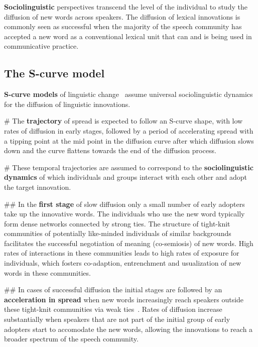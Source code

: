 \documentclass[a4paper, abstract=on]{scrartcl}
\renewcommand{\hw}[1]{\textbf{#1}}
\begin{document}
    \hw{Sociolinguistic} perspectives transcend the level of the individual to study the diffusion of new words across speakers. The diffusion of lexical innovations is commonly seen as successful when the majority of the speech community has accepted a new word as a conventional lexical unit that can and is being used in communicative practice.

  \subsection{The S-curve model}

    \hw{S-curve models} of linguistic change~\parencite{Labov2007,Milroy1992,Nevalainen2015} assume universal sociolinguistic dynamics for the diffusion of linguistic innovations.

    \begin{easylist}[itemize]

      # The \hw{trajectory} of spread is expected to follow an S-curve shape, with low rates of diffusion in early stages, followed by a period of accelerating spread with a tipping point at the mid point in the diffusion curve after which diffusion slows down and the curve flattens towards the end of the diffusion process.

      # These temporal trajectories are assumed to correspond to the \hw{sociolinguistic dynamics} of which individuals and groups interact with each other and adopt the target innovation.

        ## In the \hw{first stage} of slow diffusion only a small number of early adopters take up the innovative words. The individuals who use the new word typically form dense networks connected by strong ties. The structure of tight-knit communities of potentially like-minded individuals of similar backgrounds facilitates the successful negotiation of meaning (co-semiosis) of new words. High rates of interactions in these communities leads to high rates of exposure for individuals, which fosters co-adaption, entrenchment and usualization of new words in these communities.

        ## In cases of successful diffusion the initial stages are followed by an \hw{acceleration in spread} when new words increasingly reach speakers outside these tight-knit communities via weak ties~\parencite{Granovetter1977}. Rates of diffusion increase substantially when speakers that are not part of the initial group of early adopters start to accomodate the new words, allowing the innovations to reach a broader spectrum of the speech community.


\end{easylist}
\end{document}
